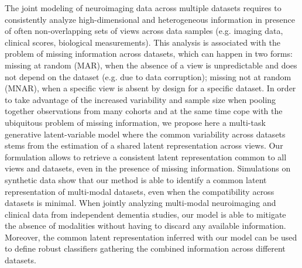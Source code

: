 The joint modeling of neuroimaging data across multiple datasets requires to consistently analyze high-dimensional and heterogeneous information in presence of often non-overlapping sets of views across data samples (e.g. imaging data, clinical scores, biological measurements).
This analysis is associated with the problem of missing information across datasets, which can happen in two forms:
missing at random (MAR), when the absence of a view is unpredictable and does not depend on the dataset (e.g. due to data corruption);
missing not at random (MNAR), when a specific view is absent by design for a specific dataset.
%
In order to take advantage of the increased variability and sample size when pooling together observations from many cohorts
and at the same time cope with the ubiquitous problem of missing information,
we propose here a multi-task generative latent-variable model where the common variability across datasets stems from the estimation of a shared latent representation across views.
Our formulation allows to retrieve a consistent latent representation common to all views and datasets, even in the presence of missing information.
%
Simulations on synthetic data show that our method is able to identify a common latent representation of multi-modal datasets, even when the compatibility across datasets is minimal.
%
When jointly analyzing multi-modal neuroimaging and clinical data from independent dementia studies, our model is able to mitigate the absence of modalities without having to discard any available information.
Moreover, the common latent representation inferred with our model can be used to define robust classifiers gathering the combined information across different datasets.
